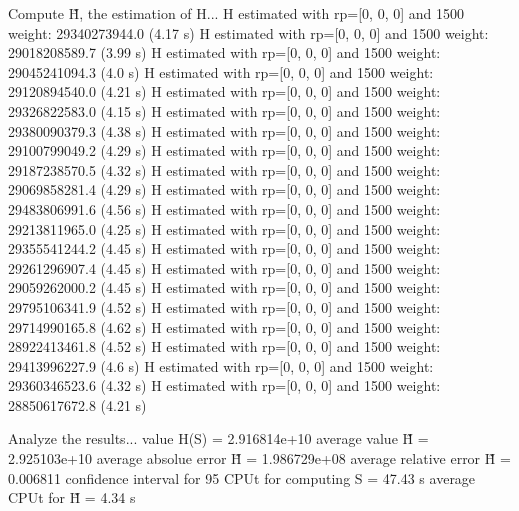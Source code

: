 Compute H̃, the estimation of H...
  H estimated with rp=[0, 0, 0] and 1500 weight:  29340273944.0  (4.17 s)
  H estimated with rp=[0, 0, 0] and 1500 weight:  29018208589.7  (3.99 s)
  H estimated with rp=[0, 0, 0] and 1500 weight:  29045241094.3  (4.0 s)
  H estimated with rp=[0, 0, 0] and 1500 weight:  29120894540.0  (4.21 s)
  H estimated with rp=[0, 0, 0] and 1500 weight:  29326822583.0  (4.15 s)
  H estimated with rp=[0, 0, 0] and 1500 weight:  29380090379.3  (4.38 s)
  H estimated with rp=[0, 0, 0] and 1500 weight:  29100799049.2  (4.29 s)
  H estimated with rp=[0, 0, 0] and 1500 weight:  29187238570.5  (4.32 s)
  H estimated with rp=[0, 0, 0] and 1500 weight:  29069858281.4  (4.29 s)
  H estimated with rp=[0, 0, 0] and 1500 weight:  29483806991.6  (4.56 s)
  H estimated with rp=[0, 0, 0] and 1500 weight:  29213811965.0  (4.25 s)
  H estimated with rp=[0, 0, 0] and 1500 weight:  29355541244.2  (4.45 s)
  H estimated with rp=[0, 0, 0] and 1500 weight:  29261296907.4  (4.45 s)
  H estimated with rp=[0, 0, 0] and 1500 weight:  29059262000.2  (4.45 s)
  H estimated with rp=[0, 0, 0] and 1500 weight:  29795106341.9  (4.52 s)
  H estimated with rp=[0, 0, 0] and 1500 weight:  29714990165.8  (4.62 s)
  H estimated with rp=[0, 0, 0] and 1500 weight:  28922413461.8  (4.52 s)
  H estimated with rp=[0, 0, 0] and 1500 weight:  29413996227.9  (4.6 s)
  H estimated with rp=[0, 0, 0] and 1500 weight:  29360346523.6  (4.32 s)
  H estimated with rp=[0, 0, 0] and 1500 weight:  28850617672.8  (4.21 s)

Analyze the results...
  value H(S)                  = 2.916814e+10 
  average value H̃             = 2.925103e+10 
  average absolue error H̃     = 1.986729e+08 
  average relative error H̃    = 0.006811 
  confidence interval for 95%
  CPUt for computing S         = 47.43 s
  average CPUt for H̃           = 4.34 s

